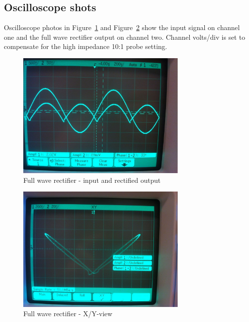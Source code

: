 \documentclass[11pt,a4paper]{article}
\begin{document}
\subsection{Oscilloscope shots}\label{fwr-oscilloscope-shots}
Oscilloscope photos in Figure~\ref{fig:fwr1_scope} and
Figure~\ref{fig:fwr2_scope} show the input signal on channel one and the full
wave rectifier output on channel two.  Channel volts/div is set to compensate
for the high impedance 10:1 probe setting. 

\begin{figure}[htbp]
    \centering
    \includegraphics[width=0.75\textwidth]{img/fwr1.jpg}
    \caption{Full wave rectifier - input and rectified output}
    \label{fig:fwr1_scope}
\end{figure}

\begin{figure}[htbp]
    \centering
    \includegraphics[width=0.75\textwidth]{img/fwr2.jpg}
    \caption{Full wave rectifier - X/Y-view}
    \label{fig:fwr2_scope}
\end{figure}
\end{document}
